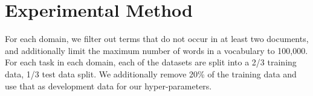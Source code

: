 





\section{Experimental Method}\label{ch3:datasets}

 For each domain, we filter out terms that do not occur in at least two documents, and additionally limit the maximum number of words in a vocabulary to 100,000. For each task in each domain,  each of the datasets are split into a 2/3 training data, 1/3 test data split.  We additionally remove 20\% of the training data and use that as development data for our hyper-parameters.  



